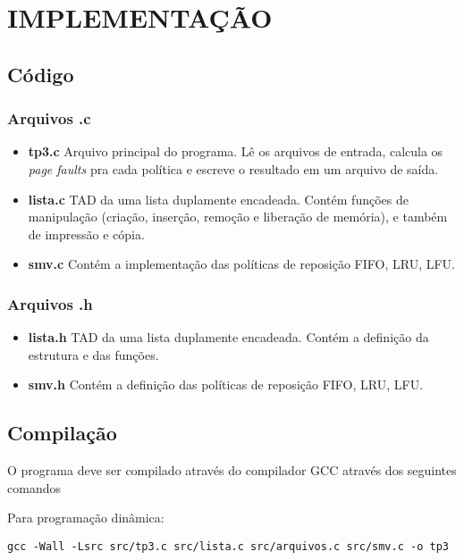 \documentclass[12pt]{article}
\begin{document}
\section{IMPLEMENTAÇÃO}
\label{implementacao}

\subsection{Código}

\subsubsection{Arquivos .c}

\begin{itemize}
\item \textbf{tp3.c} Arquivo principal do programa. Lê os arquivos de entrada, calcula os \textit{page faults} pra cada política e escreve o resultado em um arquivo de saída.
\item \textbf{lista.c} TAD da uma lista duplamente encadeada. Contém funções de manipulação (criação, inserção, remoção e liberação de memória), e também de impressão e cópia.
\item \textbf{smv.c} Contém a implementação das políticas de reposição FIFO, LRU, LFU.
\end{itemize}

\subsubsection{Arquivos .h}

\begin{itemize}
\item \textbf{lista.h} TAD da uma lista duplamente encadeada. Contém a definição da estrutura e das funções.
\item \textbf{smv.h} Contém a definição das políticas de reposição FIFO, LRU, LFU.
\end{itemize}

\subsection{Compilação}

O programa deve ser compilado através do compilador GCC através dos seguintes comandos

Para programação dinâmica:
\begin{footnotesize}
\begin{verbatim}
gcc -Wall -Lsrc src/tp3.c src/lista.c src/arquivos.c src/smv.c -o tp3 \end{verbatim}
\end{footnotesize}
\end{document}
